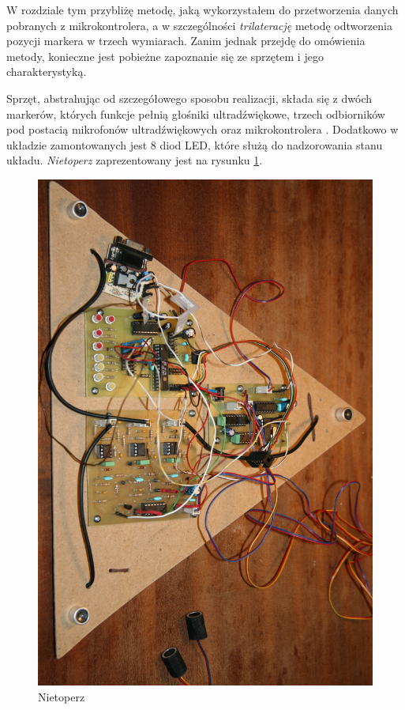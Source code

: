 \label{ch:solution} %

W rozdziale tym przybliżę metodę, jaką wykorzystałem do przetworzenia danych pobranych z mikrokontrolera, a w szczególności \emph{trilaterację} \ppauza metodę odtworzenia pozycji markera w trzech wymiarach. Zanim jednak przejdę do omówienia metody, konieczne jest pobieżne zapoznanie się ze sprzętem i jego charakterystyką.

Sprzęt, abstrahując od szczegółowego sposobu realizacji, składa się z dwóch markerów, których funkcje pełnią głośniki ultradźwiękowe, trzech odbiorników pod postacią mikrofonów ultradźwiękowych oraz mikrokontrolera . Dodatkowo w układzie zamontowanych jest 8 diod LED, które służą do nadzorowania stanu układu. \textsl{Nietoperz} zaprezentowany jest na rysunku \ref{fig:nietoperz}.

\begin{figure}
  \includegraphics[width=\textwidth]{gfx/nietoperz.jpg}
  \caption{Nietoperz}
  \label{fig:nietoperz}
\end{figure}

